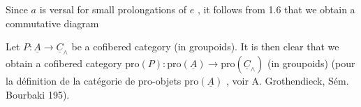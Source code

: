 \begin{center}
\end{center}
Since  $a$  is versal for small prolongations of  $e$  , it follows from 1.6 that we obtain a commutative diagram
Let  $P : \underline{A} \to \underline{C}_\wedge$  be a cofibered category (in groupoids). It is then clear that we obtain a cofibered category  $\mathrm{pro}(P) : \mathrm{pro}(\underline{A}) \to \mathrm{pro}(\underline{C}_\wedge)$  (in groupoids) (pour la définition de la catégorie de pro-objets  $\mathrm{pro}(\underline{A})$  , voir A. Grothendieck, Sém. Bourbaki 195).

